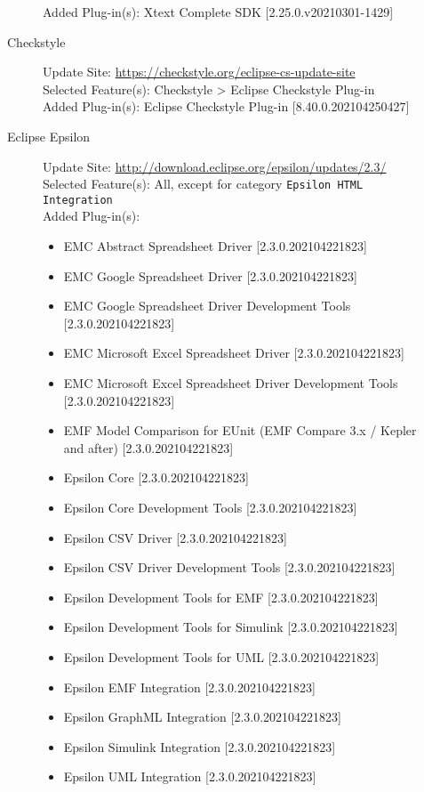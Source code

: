 \begin{description}
\begin{description}
			Added Plug-in(s): Xtext Complete SDK [2.25.0.v20210301-1429]
			\item[Checkstyle] $ $\\
			Update Site: \url{https://checkstyle.org/eclipse-cs-update-site} \\
			Selected Feature(s): Checkstyle > Eclipse Checkstyle Plug-in \\
			Added Plug-in(s): Eclipse Checkstyle Plug-in [8.40.0.202104250427]
			\item[Eclipse Epsilon] $ $\\
			Update Site: \url{http://download.eclipse.org/epsilon/updates/2.3/} \\
			Selected Feature(s): All, except for category \texttt{Epsilon HTML Integration} \\
			Added Plug-in(s):
			\begin{itemize}
				\item EMC Abstract Spreadsheet Driver [2.3.0.202104221823]
				\item EMC Google Spreadsheet Driver [2.3.0.202104221823]
				\item EMC Google Spreadsheet Driver Development Tools [2.3.0.202104221823]
				\item EMC Microsoft Excel Spreadsheet Driver [2.3.0.202104221823]
				\item EMC Microsoft Excel Spreadsheet Driver Development Tools [2.3.0.202104221823]
				\item EMF Model Comparison for EUnit (EMF Compare 3.x / Kepler and after) [2.3.0.202104221823]
				\item Epsilon Core [2.3.0.202104221823]
				\item Epsilon Core Development Tools [2.3.0.202104221823]
				\item Epsilon CSV Driver [2.3.0.202104221823]
				\item Epsilon CSV Driver Development Tools [2.3.0.202104221823]
				\item Epsilon Development Tools for EMF [2.3.0.202104221823]
				\item Epsilon Development Tools for Simulink [2.3.0.202104221823]
				\item Epsilon Development Tools for UML [2.3.0.202104221823]
				\item Epsilon EMF Integration [2.3.0.202104221823]
				\item Epsilon GraphML Integration [2.3.0.202104221823]
				\item Epsilon Simulink Integration [2.3.0.202104221823]
				\item Epsilon UML Integration [2.3.0.202104221823]

\end{itemize}
\end{description}
\end{description}
